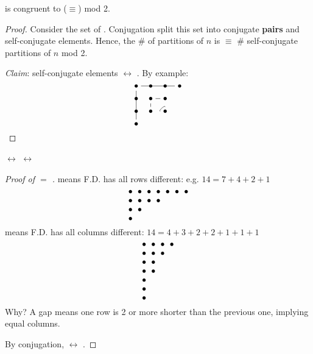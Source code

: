 \documentclass[12pt]{article}
\begin{document}
\begin{theorem}
     is congruent to ($\equiv$)  mod 2.
\end{theorem}
\begin{proof}
    Consider the set of . Conjugation split this set into conjugate \textbf{pairs} and self-conjugate elements. Hence, the \# of partitions of $n$ is $\equiv$ \# self-conjugate partitions of $n$ mod 2. 

    \textit{Claim}: self-conjugate elements $\longleftrightarrow$ . By example: \[\begin{tikzcd}[ampersand replacement=\&,cramped, sep=tiny]
        \bullet \& \bullet \& \bullet \& \bullet \\
        \bullet \& \bullet \& \bullet \\
        \bullet \& \bullet \& \bullet \\
        \bullet
        \arrow[no head, from=1-1, to=1-4]
        \arrow[no head, from=1-1, to=4-1]
        \arrow[no head, from=2-2, to=2-3]
        \arrow[no head, from=2-2, to=3-2]
        \arrow[no head, from=3-3, to=3-3, loop, in=90, out=180, distance=1mm]
    \end{tikzcd}\]
\end{proof}

\begin{theorem}
     $\longleftrightarrow$  $\longleftrightarrow$ 
\end{theorem}
\begin{proof}[Proof of \rt{\#} $=$ \bt{\#}]
     means F.D. has all rows different: e.g. $14=7+4+2+1$ \[\begin{tikzcd}[ampersand replacement=\&,cramped,sep=0pt]
        \bullet \& \bullet \& \bullet \& \bullet \& \bullet \& \bullet \& \bullet \\
        \bullet \& \bullet \& \bullet \& \bullet \\
        \bullet \& \bullet \\
        \bullet
    \end{tikzcd}\]
     means F.D. has all columns different: $14=4+3+2+2+1+1+1$ \[\begin{tikzcd}[ampersand replacement=\&,cramped,sep=0pt]
        \bullet \& \bullet \& \bullet \& \bullet \\
        \bullet \& \bullet \& \bullet \\
        \bullet \& \bullet \\
        \bullet \& \bullet \\
        \bullet \\
        \bullet \\
        \bullet
    \end{tikzcd}\]
    Why? A gap means one row is 2 or more shorter than the previous one, implying equal columns.

    By conjugation,  $\longleftrightarrow$ .
\end{proof}
\end{document}
